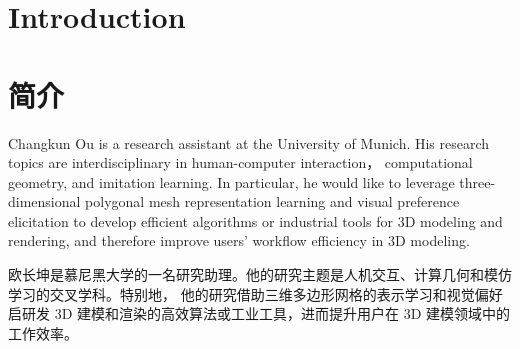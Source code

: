
 {
\section{\textbf{Introduction}}
}{
\section{\textbf{简介}}
}

 {

Changkun Ou is a research assistant at the University of Munich. His research topics are interdisciplinary in human-computer interaction， computational geometry, and imitation learning. In particular, 
he would like to leverage three-dimensional polygonal mesh representation learning and visual preference elicitation to develop efficient algorithms or industrial tools for 3D modeling and rendering, and therefore improve users' workflow efficiency in 3D modeling.

}{

欧长坤是慕尼黑大学的一名研究助理。他的研究主题是人机交互、计算几何和模仿学习的交叉学科。特别地，
他的研究借助三维多边形网格的表示学习和视觉偏好启研发 3D 建模和渲染的高效算法或工业工具，进而提升用户在 3D 建模领域中的工作效率。

}